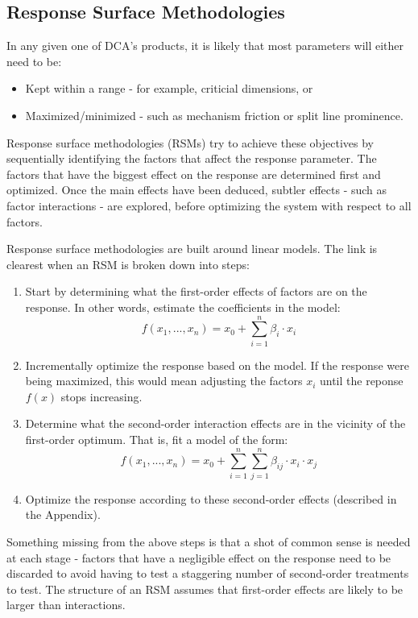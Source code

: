 \documentclass[11pt,a4paper,article]{memoir} %
\begin{document}
\subsection*{Response Surface Methodologies}
In any given one of DCA's products, it is likely that most parameters will either need to be:
\begin{itemize}
	\item Kept within a range - for example, criticial dimensions, or
	\item Maximized/minimized - such as mechanism friction or split line prominence.
\end{itemize}
Response surface methodologies (RSMs) try to achieve these objectives by sequentially identifying the factors that affect the response parameter. The factors that have the biggest effect on the response are determined first and optimized. Once the main effects have been deduced, subtler effects - such as factor interactions - are explored, before optimizing the system with respect to all factors.

Response surface methodologies are built around linear models. The link is clearest when an RSM is broken down into steps:
\begin{enumerate}
\item Start by determining what the first-order effects of factors are on the response. In other words, estimate the coefficients in the model:
\begin{equation}
	f(x_1, ..., x_n) = x_0 + \sum_{i = 1}^n \beta_i \cdot x_i
\end{equation}
\item Incrementally optimize the response based on the model. If the response were being maximized, this would mean adjusting the factors $x_i$ until the reponse $f(x)$ stops increasing. 
\item Determine what the second-order interaction effects are in the vicinity of the first-order optimum. That is, fit a model of the form:
\begin{equation}
	f(x_1, ..., x_n) = x_0 + \sum_{i = 1}^n \sum_{j = 1}^n \beta_{ij}\cdot x_i \cdot x_j
\end{equation}
\item Optimize the response according to these second-order effects (described in the Appendix).
\end{enumerate}
Something missing from the above steps is that a shot of common sense is needed at each stage - factors that have a negligible effect on the response need to be discarded to avoid having to test a staggering number of second-order treatments to test. The structure of an RSM assumes that first-order effects are likely to be larger than interactions. 
\end{document}
